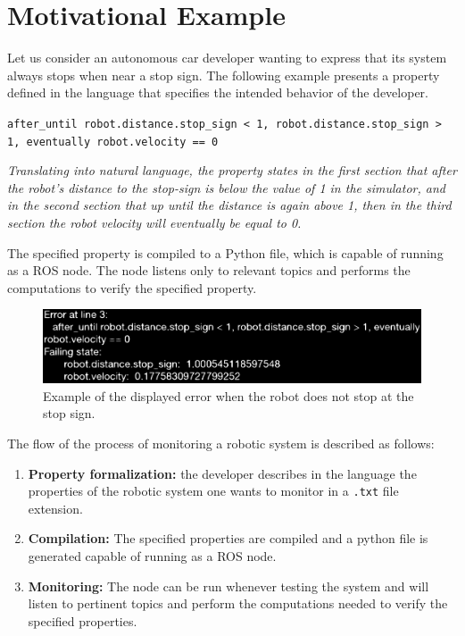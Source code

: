\documentclass[runningheads]{llncs}
\begin{document}
\section{Motivational Example}

Let us consider an autonomous car developer wanting to express that its system always stops when near a stop sign. The following example presents a property defined in the language that specifies the intended behavior of the developer.


\vspace{3mm}
\texttt{after\_until robot.distance.stop\_sign < 1, robot.distance.stop\_sign > 1, eventually robot.velocity == 0}
\vspace{3mm}

\textit{Translating into natural language, the property states in the first section that after the robot's distance to the stop-sign is below the value of 1 in the simulator, and in the second section that up until the distance is again above 1, then in the third section the robot velocity will eventually be equal to 0.}
\vspace{3mm}

The specified property is compiled to a Python file, which is capable of running as a ROS node. The node listens only to relevant topics and performs the computations to verify the specified property.

\begin{figure}
\includegraphics[width=\textwidth]{error.eps}
\caption{Example of the displayed error when the robot does not stop at the stop sign.} \label{fig1}
\end{figure}

The flow of the process of monitoring a robotic system is described as follows:

\begin{enumerate}[label=(\roman*)]
    \item \textbf{Property formalization:} the developer describes in the language the properties of the robotic system one wants to monitor in a \texttt{.txt} file extension.
    \item \textbf{Compilation:} The specified properties are compiled and a python file is generated capable of running as a ROS node.
    \item \textbf{Monitoring:} The node can be run whenever testing the system and will listen to pertinent topics and perform the computations needed to verify the specified properties.
\end{enumerate}
\end{document}
